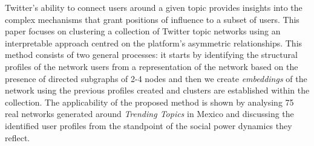 
Twitter's ability to connect users around a given topic provides insights into the complex mechanisms that grant positions of influence to a subset of users. This paper focuses on clustering a collection of Twitter topic networks using an interpretable approach centred on the platform's asymmetric relationships. This method consists of two general processes: it starts by identifying the structural profiles of the network users from a representation of the network based on the presence of directed subgraphs of 2-4 nodes and then we create \textit{embeddings} of the network using the previous profiles created and clusters are established within the collection. The applicability of the proposed method is shown by analysing 75 real networks generated around \textit{Trending Topics} in Mexico and discussing the identified user profiles from the standpoint of the social power dynamics they reflect.